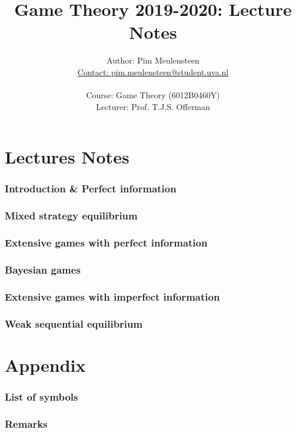 \documentclass[tikz,a4paper,12pt]{article}
\title{Game Theory 2019-2020: Lecture Notes}
\author{Author: Pim Meulensteen\\
\href{mailto:pim.meulensteen@student.uva.nl}{Contact: pim.meulensteen@student.uva.nl}\\
\\
Course: Game Theory (6012B0460Y)\\
Lecturer: Prof. T.J.S. Offerman\\
}
\begin{document}
\maketitle
\tableofcontents
\clearpage

\pagestyle{headings}
\part{Lectures Notes}
\section{Introduction \& Perfect information}

\clearpage

\section{Mixed strategy equilibrium}

\clearpage

\section{Extensive games with perfect information}

\clearpage

\section{Bayesian games}

\clearpage

\section{Extensive games with imperfect information}

\clearpage

\section{Weak sequential equilibrium}

\clearpage

\part{Appendix}
\section{List of symbols}


\section{Remarks}

\end{document}
